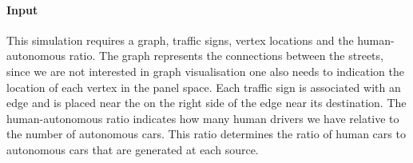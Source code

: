 \paragraph{Input}
\label{par:method:model:details:input}
This simulation requires a graph, traffic signs, vertex locations and the human-autonomous ratio. The graph represents the connections between the streets, since we are not interested in graph visualisation one also needs to indication the location of each vertex in the panel space. Each traffic sign is associated with an edge and is placed near the on the right side of the edge near its destination. The human-autonomous ratio indicates how many human drivers we have relative to the number of autonomous cars. This ratio determines the ratio of human cars to autonomous cars that are generated at each source. 
